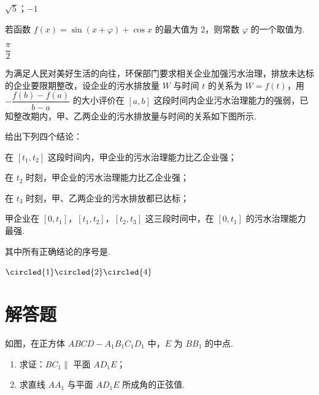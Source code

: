 \begin{answer}
\(\sqrt{5}\)；\(-1\)
\end{answer}

\begin{problem}
若函数 \(f(x)=\sin(x+\varphi)+\cos x\) 的最大值为 \(2\)，则常数 \(\varphi\) 的一个取值为\fillinblank{}.
\end{problem}

\begin{answer}
\(\dfrac{\pi}{2}\)
\end{answer}

\begin{problem}
为满足人民对美好生活的向往，环保部门要求相关企业加强污水治理，排放未达标的企业要限期整改，设企业的污水排放量 \(W\) 与时间 \(t\) 的关系为 \(W=f(t)\)，用 \(-\dfrac{f(b)-f(a)}{b-a}\) 的大小评价在 \([a,b]\) 这段时间内企业污水治理能力的强弱，已知整改期内，甲、乙两企业的污水排放量与时间的关系如下图所示.

给出下列四个结论：

\begin{circlelist}
\item 在 \([t_1,t_2]\) 这段时间内，甲企业的污水治理能力比乙企业强；

\item 在 \(t_2\) 时刻，甲企业的污水治理能力比乙企业强；

\item 在 \(t_3\) 时刻，甲、乙两企业的污水排放都已达标；

\item 甲企业在 \([0,t_1]\)，\([t_1,t_2]\)，\([t_2,t_3]\) 这三段时间中，在 \([0,t_1]\) 的污水治理能力最强.
\end{circlelist}
其中所有正确结论的序号是\fillinblank{}.

\begin{center}
\end{center}
\end{problem}

\begin{answer}
\(\circled{1}\circled{2}\circled{4}\)
\end{answer}

\section{解答题}

\begin{problem}
如图，在正方体 \(ABCD-A_1B_1C_1D_1\) 中，\(E\) 为 \(BB_1\) 的中点.

\begin{enumerate}
    \item 求证：\(BC_1\parallel\) 平面 \(AD_1E\)；
    \item 求直线 \(AA_1\) 与平面 \(AD_1E\) 所成角的正弦值.
\end{enumerate}

\begin{center}
\end{center}
\end{problem}

